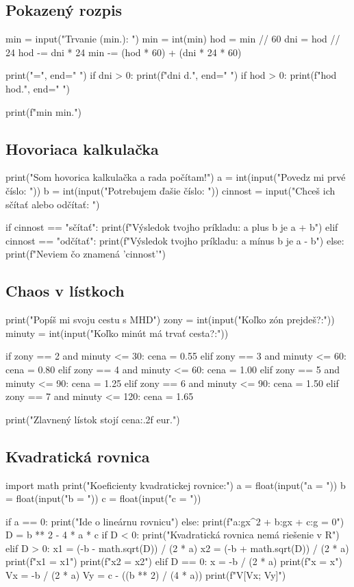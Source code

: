 \subsection{Pokazený rozpis}
\begin{solution}
min = input("Trvanie (min.): ")
min = int(min)
hod = min // 60
dni = hod // 24
hod -= dni * 24
min -= (hod * 60) + (dni * 24 * 60)

print("=", end=" ")
if dni > 0:
    print(f"{dni} d.", end=" ")
if hod > 0:
    print(f"{hod} hod.", end=" ")

print(f"{min} min.")
\end{solution}

\subsection{Hovoriaca kalkulačka}
\begin{solution}
print("Som hovorica kalkulačka a rada počítam!")
a = int(input("Povedz mi prvé číslo: "))
b = int(input("Potrebujem ďašie číslo: "))
cinnost = input("Chceš ich sčítať alebo odčítať: ")

if cinnost == "sčítať":
    print(f"Výsledok tvojho príkladu: {a} plus {b} je {a + b}")
elif cinnost == "odčítať":
    print(f"Výsledok tvojho príkladu: {a} mínus {b} je {a - b}")
else:
    print(f"Neviem čo znamená '{cinnost}'")
\end{solution}

\subsection{Chaos v lístkoch}
\begin{solution}
print("Popíš mi svoju cestu s MHD")
zony = int(input("Koľko zón prejdeš?:"))
minuty = int(input("Koľko minút má trvať cesta?:"))

if zony == 2 and minuty <= 30:
	cena = 0.55
elif zony == 3 and minuty <= 60:
	cena = 0.80
elif zony == 4 and minuty <= 60:
	cena = 1.00
elif zony == 5 and minuty <= 90:
	cena = 1.25
elif zony == 6 and minuty <= 90:
	cena = 1.50
elif zony == 7 and minuty <= 120:
	cena = 1.65

print("Zlavnený lístok stojí {cena:.2f} eur.")
\end{solution} 

\subsection{Kvadratická rovnica}
\begin{solution}
import math
print("Koeficienty kvadratickej rovnice:")
a = float(input("a = "))
b = float(input("b = "))
c = float(input("c = "))

if a == 0:
	print("Ide o lineárnu rovnicu")
else:
	print(f"{a:g}x^2 + {b:g}x + {c:g} = 0")
	D = b ** 2 - 4 * a * c
	if D < 0:
		print("Kvadratická rovnica nemá riešenie v R")
	elif D > 0:
		x1 = (-b - math.sqrt(D)) / (2 * a)
		x2 = (-b + math.sqrt(D)) / (2 * a)
		print(f"x1 = {x1}")
		print(f"x2 = {x2}")
	elif D == 0:
		x = -b / (2 * a)
		print(f"x = {x}")
		Vx = -b / (2 * a)
		Vy = c - ((b ** 2) / (4 * a))
		print(f"V[{Vx}; {Vy}]")
\end{solution}

